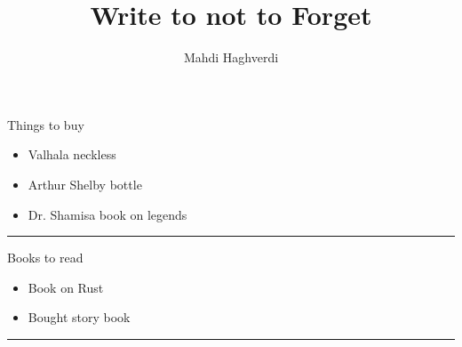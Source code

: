 \documentclass{article}
\title{Write to not to Forget}
\author{Mahdi Haghverdi}
\begin{document}
	\maketitle
	
	\begin{flushleft}
		{\LARGE Things to buy}
		\begin{itemize}
			\item Valhala neckless
			\item Arthur Shelby bottle
			\item Dr. Shamisa book on legends
		\end{itemize}
	\end{flushleft}
	\hrule
	
	\begin{flushleft}
		{\LARGE Books to read}
		\begin{itemize}
			\item Book on Rust
			\item Bought story book
		\end{itemize}
	\end{flushleft}
	\hrule
	
\end{document}
